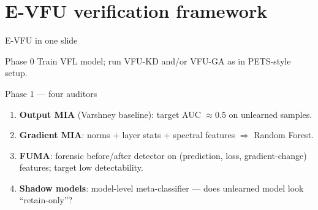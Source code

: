\documentclass[aspectratio=169, 11pt]{beamer}
\begin{document}
\section{E-VFU verification framework}

\begin{frame}{E-VFU in one slide}
  \begin{block}{Phase 0}
    Train VFL model; run \textsc{VFU-KD} and/or \textsc{VFU-GA} as in PETS-style setup.
  \end{block}
  \begin{block}{Phase 1 --- four auditors}
    \begin{enumerate}
      \item \textbf{Output MIA} (Varshney baseline): target AUC $\approx 0.5$ on unlearned samples.
      \item \textbf{Gradient MIA}: norms + layer stats + spectral features $\Rightarrow$ Random Forest.
      \item \textbf{FUMA}: forensic before/after detector on (prediction, loss, gradient-change) features; target low detectability.
      \item \textbf{Shadow models}: model-level meta-classifier --- does unlearned model look ``retain-only''?
    \end{enumerate}
  \end{block}
\end{frame}
\end{document}
